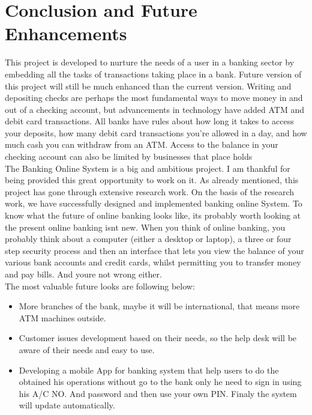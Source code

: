 \chapter{Conclusion and Future Enhancements}
This project is developed to nurture the needs of a user in a banking sector by embedding all
the tasks of transactions taking place in a bank. Future version of this project will still be
much enhanced than the current version. Writing and depositing checks are perhaps the most
fundamental ways to move money in and out of a checking account, but advancements in
technology have added ATM and debit card transactions. All banks have rules about how
long it takes to access your deposits, how many debit card transactions you're allowed in a
day, and how much cash you can withdraw from an ATM. Access to the balance in your
checking account can also be limited by businesses that place holds \\[0.2in]

The Banking Online System is a big and ambitious project. I am thankful for being
provided this great opportunity to work on it. As already mentioned, this project has gone
through extensive research work. On the basis of the research work, we have successfully
designed and implemented banking online System. To know what the future of online
banking looks like, its probably worth looking at the present online banking isnt new. When
you think of online banking, you probably think about a computer (either a desktop or
laptop), a three or four step security process and then an interface that lets you view the
balance of your various bank accounts and credit cards, whilst permitting you to transfer
money and pay bills. And youre not wrong either. \\[0.2in]
The most valuable future looks are following below:
\begin{itemize}
\item More branches of the bank, maybe it will be international, that means more ATM
machines outside.
\item Customer issues development based on their needs, so the help desk will be aware of
their needs and easy to use.
\item Developing a mobile App for banking system that help users to do the obtained his
operations without go to the bank only he need to sign in using his A/C NO. And
password and then use your own PIN. Finaly the system will update automatically.
\end{itemize}
